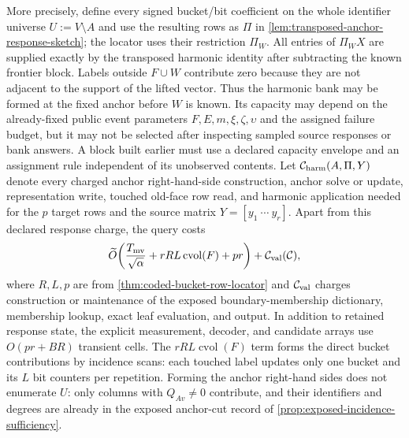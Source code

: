 \begin{corollary}
More precisely, define every signed bucket/bit coefficient on the whole
identifier universe $U:=V\setminus A$ and use the resulting rows as $\Pi$ in
\cref{lem:transposed-anchor-response-sketch}; the locator uses their
restriction $\Pi_W$.  All entries of $\Pi_WX$ are supplied exactly by the
transposed harmonic identity after subtracting the known frontier block.
Labels outside $F\cup W$ contribute zero because they are not adjacent to the
support of the lifted vector.  Thus the harmonic bank may be formed at the
fixed anchor before $W$ is known.  Its capacity may depend on the already-fixed
public event parameters $F,E,m,\xi,\zeta,\upsilon$ and the assigned failure
budget, but it may not be selected after inspecting sampled source responses or
bank answers.  A block built earlier must use a declared capacity envelope and
an assignment rule independent of its unobserved contents.  Let
$\mathcal C_{\rm harm}(A,\Pi,Y)$ denote every charged anchor right-hand-side
construction, anchor solve or update, representation write, touched old-face
row read, and harmonic application needed for the $p$ target rows and the
source matrix $Y=[y_1\ \cdots\ y_r]$.  Apart from this declared response
charge, the query costs
\begin{equation}
 \widetilde O\!\left(
  \frac{T_{\rm mv}}{\sqrt\alpha}
  +rRL\operatorname{cvol}(F)
  +pr
 \right)
 +\mathcal C_{\rm val}(\mathcal C),
 \label{eq:coded-harmonic-query-work}
\end{equation}
where $R,L,p$ are from
\cref{thm:coded-bucket-row-locator} and
$\mathcal C_{\rm val}$ charges construction or maintenance of the exposed
boundary-membership dictionary, membership lookup, exact leaf evaluation, and
output.  In addition to retained response state, the explicit measurement,
decoder, and candidate arrays use $O(pr+BR)$ transient cells.  The
$rRL\operatorname{cvol}(F)$ term forms the direct bucket
contributions by incidence scans: each touched label updates only one bucket
and its $L$ bit counters per repetition.
Forming the anchor right-hand sides does not enumerate $U$: only columns with
$Q_{Av}\neq0$ contribute, and their identifiers and degrees are already in
the exposed anchor-cut record of
\cref{prop:exposed-incidence-sufficiency}.


\end{corollary}
